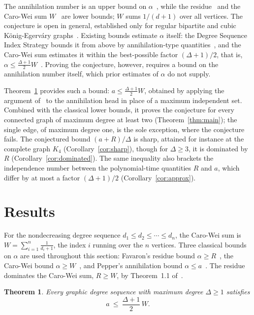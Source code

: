 \documentclass[11pt]{article}
\newtheorem{theorem}{Theorem}
\theoremstyle{remark}
\newcommand{\degseq}{d_1 \le d_2 \le \cdots \le d_n}
\begin{document}
The annihilation number is an upper bound on $\alpha$~\cite{Pepper2009}, while
the residue~\cite{Favaron1991} and the Caro-Wei sum $W$~\cite{Caro1979, Wei1981}
are lower bounds; $W$ sums $1/(d+1)$ over all vertices. The conjecture is open in
general, established only for regular bipartite and cubic K\"onig-Egerv\'ary
graphs~\cite{Davila2025reverie}. Existing bounds estimate $\alpha$
itself: the Degree Sequence Index Strategy bounds it from above
by annihilation-type quantities~\cite{CaroPepper2014}, and the Caro-Wei sum
estimates it within the best-possible factor $(\Delta+1)/2$, that is,
$\alpha \le \tfrac{\Delta+1}{2}W$~\cite{Boppana2018}. Proving the conjecture,
however, requires a bound on the annihilation number itself, which prior
estimates of $\alpha$ do not supply.

Theorem~\ref{thm:vehicle} provides such a bound: $a \le \tfrac{\Delta+1}{2}W$,
obtained by applying the argument of~\cite{Boppana2018} to the annihilation head
in place of a maximum independent set. Combined with the classical lower bounds,
it proves the conjecture for every connected graph of maximum degree at least
two (Theorem~\ref{thm:main}); the single edge, of maximum degree one, is the sole
exception, where the conjecture fails. The conjectured bound $(a+R)/\Delta$ is
sharp, attained for instance at the complete graph $K_4$
(Corollary~\ref{cor:sharp}), though for $\Delta \ge 3$, it is dominated by
$R$ (Corollary~\ref{cor:dominated}). The same inequality also brackets
the independence number between the polynomial-time quantities $R$ and
$a$, which differ by at most a factor $(\Delta+1)/2$ (Corollary~\ref{cor:approx}).

\section{Results}\label{sec:results}

For the nondecreasing degree sequence $\degseq$, the Caro-Wei sum is
$W = \sum_{i=1}^{n} \tfrac{1}{d_i+1}$, the index $i$ running over the
$n$ vertices. Three classical bounds on $\alpha$ are used throughout this
section: Favaron's residue bound $\alpha \ge R$~\cite[Thm.~3.3]{Favaron1991}, the
Caro-Wei bound $\alpha \ge W$~\cite{Caro1979, Wei1981}, and Pepper's
annihilation bound $\alpha \le a$~\cite{Pepper2009}. The residue dominates
the Caro-Wei sum, $R \ge W$, by Theorem~1.1 of~\cite{Favaron1991}.

\begin{theorem}\label{thm:vehicle}
Every graphic degree sequence with maximum degree $\Delta \ge 1$ satisfies
\[
  a \ \le\ \frac{\Delta+1}{2}\, W.
\]
\end{theorem}
\end{document}
